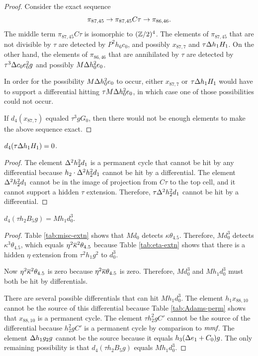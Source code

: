 \begin{proof}
Consider the exact sequence
\[
\pi_{87,45} \rightarrow \pi_{87,45} C\tau \rightarrow \pi_{86,46}.
\]
The middle term $\pi_{87,45} C\tau$ is isomorphic to $(\mathbb{Z}/2)^4$.
The elements of $\pi_{87,45}$ that are not divisible by
$\tau$ are detected by $P^2 h_6 c_0$, and possibly
$x_{87,7}$ and $\tau \Delta h_1 H_1$.
On the other hand, the elements of $\pi_{86,46}$ that are
annihilated by $\tau$ are detected by
$\tau^3 \Delta c_0 e_0^2 g$ and possibly $M \Delta h_0^2 e_0$.

In order for the possibility $M \Delta h_0^2 e_0$ to occur,
either $x_{87,7}$ or $\tau \Delta h_1 H_1$ would have to support
a differential hitting $\tau M \Delta h_0^2 e_0$, in which case
one of those possibilities could not occur.

If $d_4(x_{87,7})$ equaled $\tau^3 g G_0$, then there would not
be enough elements to make the above sequence exact.
\end{proof}

\begin{lemma}
\label{lem:d4-tDh1H1}
$d_4(\tau \Delta h_1 H_1) = 0$.
\end{lemma}

\begin{proof}
The element $\Delta^2 h_2^2 d_1$ is a permanent cycle
that cannot be hit by any differential because
$h_2 \cdot \Delta^2 h_2^2 d_1$ cannot be hit by a differential.
The element $\Delta^2 h_2^2 d_1$ cannot be in the image
of projection from $C\tau$ to the top cell,
and it cannot support a hidden $\tau$ extension.
Therefore,
$\tau \Delta^2 h_2^2 d_1$ cannot be hit by a differential.
\end{proof}

\begin{lemma}
\label{lem:d4-th2B5g}
$d_4(\tau h_2 B_5 g) = M h_1 d_0^3$.
\end{lemma}

\begin{proof}
Table \ref{tab:misc-extn} shows that
$M d_0$ detects $\kappa \theta_{4.5}$.
Therefore, $M d_0^3$ detects $\kappa^3 \theta_{4.5}$,
which equals $\eta^2 \overline{\kappa}^2 \theta_{4.5}$ because
Table \ref{tab:eta-extn} shows that there is a hidden
$\eta$ extension from $\tau^2 h_1 g^2$ to $d_0^3$.

Now $\eta^2 \overline{\kappa}^2 \theta_{4.5}$ is zero because
$\eta^2 \overline{\kappa} \theta_{4.5}$ is zero.
Therefore, $M d_0^3$ and $M h_1 d_0^3$ must both be hit
by differentials.

There are several possible differentials that can hit
$M h_1 d_0^3$.  
The element $h_1 x_{88,10}$ cannot be the source of this differential
because Table \ref{tab:Adams-perm} shows that
$x_{88,10}$ is a permanent cycle.
The element $\tau h_2^2 g C'$ cannot be the source of the differential
because $h_2^2 g C'$ is a permanent cycle by comparison to $\textit{mmf}$.
The element $\Delta h_1 g_2 g$ cannot be the source 
because it equals $h_3 (\Delta e_1 + C_0) g$.
The only remaining possibility is that
$d_4(\tau h_2 B_5 g)$ equals $M h_1 d_0^3$.
\end{proof}

